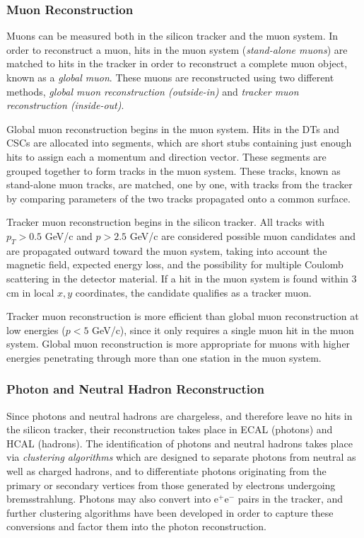 \subsubsection{Muon Reconstruction}

Muons can be measured both in the silicon tracker and the muon system. In order to reconstruct a muon, hits in the muon system (\emph{stand-alone muons}) are matched to hits in the tracker in order to reconstruct a complete muon object, known as a \emph{global muon}. These muons are reconstructed using two different methods, \emph{global muon reconstruction (outside-in)} and \emph{tracker muon reconstruction (inside-out)}.

Global muon reconstruction begins in the muon system. Hits in the DTs and CSCs are allocated into segments, which are short stubs containing just enough hits to assign each a momentum and direction vector. These segments are grouped together to form tracks in the muon system. These tracks, known as stand-alone muon tracks, are matched, one by one, with tracks from the tracker by comparing parameters of the two tracks propagated onto a common surface.

Tracker muon reconstruction begins in the silicon tracker. All tracks with $p_{T} > 0.5$ GeV/c and $p > 2.5$ GeV/c are considered possible muon candidates and are propagated outward toward the muon system, taking into account the magnetic field, expected energy loss, and the possibility for multiple Coulomb scattering in the detector material. If a hit in the muon system is found within 3 cm in local $x, y$ coordinates, the candidate qualifies as a tracker muon.

Tracker muon reconstruction is more efficient than global muon reconstruction at low energies ($p < 5$ GeV/c), since it only requires a single muon hit in the muon system. Global muon reconstruction is more appropriate for muons with higher energies penetrating through more than one station in the muon system.


\subsubsection{Photon and Neutral Hadron Reconstruction}

Since photons and neutral hadrons are chargeless, and therefore leave no hits in the silicon tracker, their reconstruction takes place in ECAL (photons) and HCAL (hadrons). The identification of photons and neutral hadrons takes place via \textit{clustering algorithms} which are designed to separate photons from neutral as well as charged hadrons, and to differentiate photons originating from the primary or secondary vertices from those generated by electrons undergoing bremsstrahlung. Photons may also convert into e$^+$e$^-$ pairs in the tracker, and further clustering algorithms have been developed in order to capture these conversions and factor them into the photon reconstruction.

